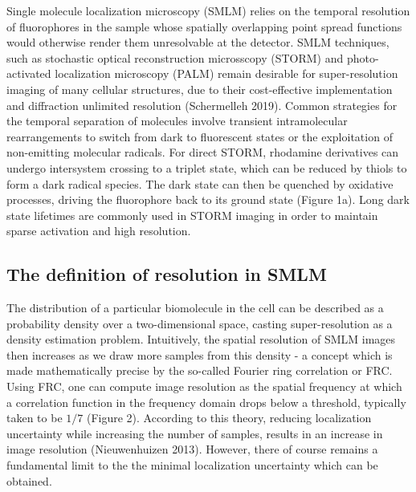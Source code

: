 \documentclass{ucetd}
\begin{document}
Single molecule localization microscopy (SMLM) relies on the temporal resolution of fluorophores in the sample whose spatially overlapping point spread functions would otherwise render them unresolvable at the detector. SMLM techniques, such as stochastic optical reconstruction microsscopy (STORM) and photo-activated localization microscopy (PALM) remain desirable for super-resolution imaging of many cellular structures, due to their cost-effective implementation and diffraction unlimited resolution (Schermelleh 2019). Common strategies for the temporal separation of molecules involve transient intramolecular rearrangements to switch from dark to fluorescent states or the exploitation of non-emitting molecular radicals. For direct STORM, rhodamine derivatives can undergo intersystem crossing to a triplet state, which can be reduced by thiols to form a dark radical species. The dark state can then be quenched by oxidative processes, driving the fluorophore back to its ground state (Figure 1a). Long dark state lifetimes are commonly used in STORM imaging in order to maintain sparse activation and high resolution.

\subsection{The definition of resolution in SMLM}

The distribution of a particular biomolecule in the cell can be described as a probability density over a two-dimensional space, casting super-resolution as a density estimation problem. Intuitively, the spatial resolution of SMLM images then increases as we draw more samples from this density - a concept which is made mathematically precise by the so-called Fourier ring correlation or FRC. Using FRC, one can compute image resolution as the spatial frequency at which a correlation function in the frequency domain drops below a threshold, typically taken to be $1/7$ (Figure 2). According to this theory, reducing localization uncertainty while increasing the number of samples, results in an increase in image resolution (Nieuwenhuizen 2013). However, there of course remains a fundamental limit to the the minimal localization uncertainty which can be obtained.
\end{document}
